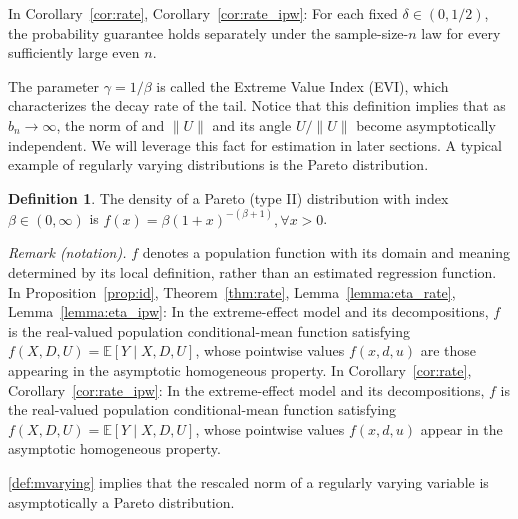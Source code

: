 \documentclass[12pt]{article}
\theoremstyle{plain}
\theoremstyle{definition}
\newtheorem{definition}[theorem]{Definition}
\begin{document}
In Corollary~\ref{cor:rate}, Corollary~\ref{cor:rate_ipw}: For each fixed $\delta\in(0,1/2)$, the probability guarantee holds separately under the sample-size-$n$ law for every sufficiently large even $n$.


The parameter $\gamma = 1/\beta$ is called the Extreme Value Index (EVI), which characterizes the decay rate of the tail. Notice that this definition implies that as $b_n \rightarrow \infty$, the norm of and $\| U \|$ and its angle $U / \| U \|$ become asymptotically independent. We will leverage this fact for estimation in later sections. A typical example of regularly varying distributions is the Pareto distribution.

\begin{definition}
  The density of a Pareto (type II) distribution with index $\beta \in (0, \infty)$ is $f (x) = \beta (1 + x)^{- (\beta + 1)}, \forall x > 0$.
\end{definition}

\noindent\textit{Remark (notation).} $f$ denotes a population function with its domain and meaning determined by its local definition, rather than an estimated regression function. In Proposition~\ref{prop:id}, Theorem~\ref{thm:rate}, Lemma~\ref{lemma:eta_rate}, Lemma~\ref{lemma:eta_ipw}: In the extreme-effect model and its decompositions, $f$ is the real-valued population conditional-mean function satisfying $f(X,D,U)=\mathbb{E}[Y\mid X,D,U]$, whose pointwise values $f(x,d,u)$ are those appearing in the asymptotic homogeneous property. In Corollary~\ref{cor:rate}, Corollary~\ref{cor:rate_ipw}: In the extreme-effect model and its decompositions, $f$ is the real-valued population conditional-mean function satisfying $f(X,D,U)=\mathbb E[Y\mid X,D,U]$, whose pointwise values $f(x,d,u)$ appear in the asymptotic homogeneous property.


\cref{def:mvarying} implies that the rescaled norm of a regularly varying variable is asymptotically a Pareto distribution. 


\end{document}
